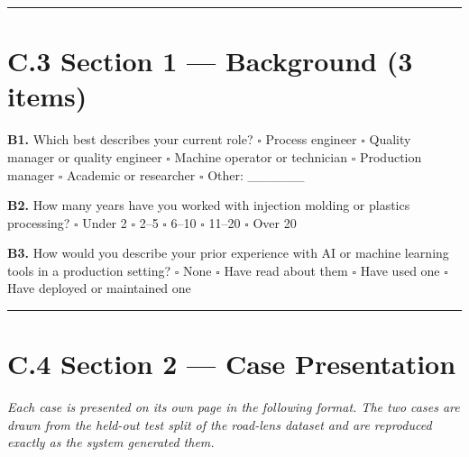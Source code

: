 \begin{center}\rule{0.5\linewidth}{0.5pt}\end{center}

\hypertarget{c.3-section-1-background-3-items}{%
\section{C.3 Section 1 --- Background (3 items)}\label{c.3-section-1-background-3-items}}

\textbf{B1.} Which best describes your current role?
$\square$ Process engineer $\square$ Quality manager or quality engineer $\square$ Machine operator or technician $\square$ Production manager $\square$ Academic or researcher $\square$ Other: \_\_\_\_\_\_

\textbf{B2.} How many years have you worked with injection molding or plastics processing?
$\square$ Under 2 $\square$ 2--5 $\square$ 6--10 $\square$ 11--20 $\square$ Over 20

\textbf{B3.} How would you describe your prior experience with AI or machine learning tools in a production setting?
$\square$ None $\square$ Have read about them $\square$ Have used one $\square$ Have deployed or maintained one

\begin{center}\rule{0.5\linewidth}{0.5pt}\end{center}

\hypertarget{c.4-section-2-case-presentation}{%
\section{C.4 Section 2 --- Case Presentation}\label{c.4-section-2-case-presentation}}

\emph{Each case is presented on its own page in the following format. The two cases are drawn from the held-out test split of the road-lens dataset and are reproduced exactly as the system generated them.}

